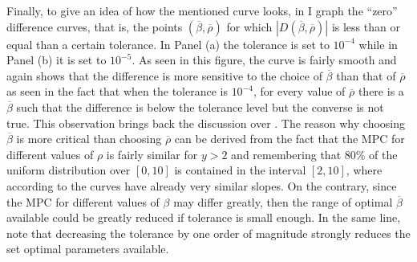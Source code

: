 \documentclass[english, a4paper, 12pt]{article}
\begin{document}
%
	
Finally, to give an idea of how the mentioned curve looks, in  I graph the ``zero'' difference curves, that is, the points $(\overline{\beta}, \overline{\rho})$ for which $|D(\overline{\beta}, \overline{\rho})|$ is less than or equal than a certain tolerance. In Panel (a) the tolerance is set to $10^{-4}$ while in Panel (b) it is set to $10^{-5}$. As seen in this figure, the curve is fairly smooth and again shows that the difference is more sensitive to the choice of $\overline{\beta}$ than that of $\overline{\rho}$ as seen in the fact that when the tolerance is $10^{-4}$, for every value of $\overline{\rho}$ there is a $\overline{\beta}$ such that the difference is below the tolerance level but the converse is not true. This observation brings back the discussion over . The reason why choosing $\overline{\beta}$ is more critical than choosing $\overline{\rho}$ can be derived from the fact that the MPC for different values of $\rho$ is fairly similar for $y > 2$ and remembering that 80\% of the uniform distribution over $[0,10]$ is contained in the interval $[2,10]$, where according to  the curves have already very similar slopes. On the contrary, since the MPC for different values of $\beta$ may differ greatly, then the range of optimal $\overline{\beta}$ available could be greatly reduced if tolerance is small enough. In the same line, note that decreasing the tolerance by one order of magnitude strongly reduces the set optimal parameters available.
\end{document}
